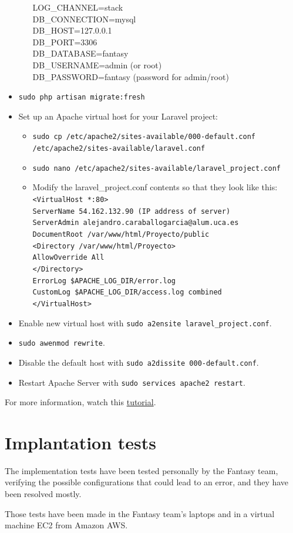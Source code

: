 \begin{itemize}
\begin{itemize}
		LOG\_CHANNEL=stack\\
		
		DB\_CONNECTION=mysql\\
		DB\_HOST=127.0.0.1\\
		DB\_PORT=3306\\
		DB\_DATABASE=fantasy\\
		DB\_USERNAME=admin (or root)\\
		DB\_PASSWORD=fantasy (password for admin/root)
	\end{itemize}
	\item \texttt{sudo php artisan migrate:fresh}
	\item Set up an Apache virtual host for your Laravel project:
	\begin{itemize}
		\item \texttt{sudo cp /etc/apache2/sites-available/000-default.conf /etc/apache2/sites-available/laravel.conf}
		\item \texttt{sudo nano /etc/apache2/sites-available/laravel\_project.conf}
		\item Modify the laravel\_project.conf contents so that they look like this:\\
		\texttt{<VirtualHost *:80>\\
			ServerName 54.162.132.90 (IP address of server)\\
			ServerAdmin alejandro.caraballogarcia@alum.uca.es\\
			DocumentRoot /var/www/html/Proyecto/public\\
			<Directory /var/www/html/Proyecto>\\
			AllowOverride All\\
			</Directory>\\
			ErrorLog \${APACHE\_LOG\_DIR}/error.log\\
			CustomLog \${APACHE\_LOG\_DIR}/access.log combined\\
			</VirtualHost>}
	\end{itemize}
	\item Enable new virtual host with \texttt{sudo a2ensite laravel\_project.conf}.
	\item \texttt{sudo awenmod rewrite}.
	\item Disable the default host with \texttt{sudo a2dissite 000-default.conf}.
	\item Restart Apache Server with \texttt{sudo services apache2 restart}.
	
\end{itemize}
\Nota
For more information, watch this \href{https://phpraxis.wordpress.com/2016/08/02/steps-for-configuring-laravel-on-apache-http-server/}{tutorial}.

\section{Implantation tests}
The implementation tests have been tested personally by the Fantasy team, verifying the possible configurations that could lead to an error, and they have been resolved mostly.

Those tests have been made in the Fantasy team's laptops and in a virtual machine EC2 from Amazon AWS.